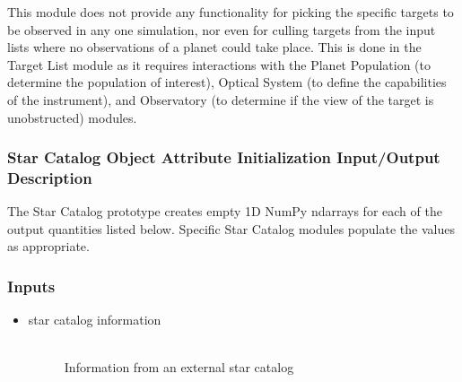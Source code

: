 \documentclass[cleanfoot]{asme2ej}
\begin{document}
This module does not provide any functionality for picking the specific targets to be observed in any one simulation, nor even for culling targets from the input lists where no observations of a planet could take place.  This is done in the Target List module as it requires interactions with the Planet Population (to determine the population of interest), Optical System (to define the capabilities of the instrument), and Observatory (to determine if the view of the target is unobstructed) modules.

\subsubsection{Star Catalog Object Attribute Initialization Input/Output Description} 
The Star Catalog prototype creates empty 1D NumPy ndarrays for each of the output quantities listed below.  Specific Star Catalog modules populate the values as appropriate.

\subsubsection*{Inputs}
\begin{itemize}
    \item 
    \begin{description}
        \item[star catalog information] \hfill \\
        Information from an external star catalog 
    \end{description}
\end{itemize}
\end{document}
